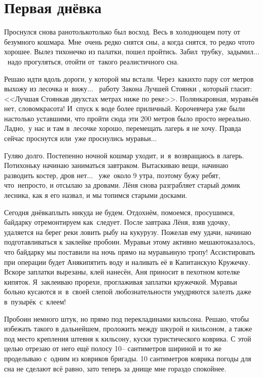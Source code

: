 \chapter{Первая днёвка}
\vepsianrose

Проснулся снова рано\mdash только\sdash только был восход. Весь в холоднющем поту от безумного кошмара. Мне~очень редко снятся сны, а когда снятся, то редко что\sdash то хорошее. Вылез тихонечко из палатки, пошел пройтись. Забил~трубку,~задымил$\ldots$ ~надо прогуляться, отойти от~такого реалистичного сна.

Решаю идти вдоль дороги, у которой мы встали. Через~каких\sdash то пару сот метров выхожу из лесочка и~вижу$\ldots$~ работу Закона Лучшей Стоянки \cite{Квадригин}, который гласит: <<Лучшая Стоянка\mdash в двухстах метрах ниже по реке>>. Полянка\mdash ровная, муравьёв нет, словом\mdash красота! И~спуск к воде более приличный. Короче\mdash вчера уже были настолько уставшими, что пройти сюда эти 200 метров было просто нереально. Ладно,~у нас и там в~лесочке хорошо, перемещать лагерь я не хочу. Правда сейчас проснутся или~уже проснулись муравьи$\ldots$

Гуляю долго. Постепенно ночной кошмар уходит, и~я~возвращаюсь в лагерь. Потихоньку начинаю заниматься завтраком. Вытаскиваю вещи, начинаю разводить костер, дров нет$\ldots$~ уже~около 9 утра, поэтому бужу ребят, что~непросто, и отсылаю за дровами. Лёня снова разграбляет старый домик лесника, как я его назвал, и мы топимся старыми досками. 

Сегодня днёвка\mdash плыть никуда не будем. Отдохнём, помоемся, просушимся, байдарку отремонтируем как~следует. После завтрака Лёня, взяв удочку, удаляется на берег реки ловить рыбу на кукурузу. Пожелав ему удачи, начинаю подготавливаться к заклейке пробоин. Муравьи этому активно мешают\mdash оказалось, что байдарку мы поставили на ночь прямо на муравьиную тропу! Ассистировать при операции будет Аня\mdash кипятить воду и наливать её в Капитанскую Кружечку. Вскоре заплатки вырезаны, клей нанесён, Аня приносит в пехотном котелке кипяток. Я~заклеиваю прорехи, проглаживая заплатки кружечкой. Муравьи больно кусаются и~в~своей слепой любознательности умудряются залезть даже в~пузырёк~с~клеем! 

Пробоин немного штук, но прямо под перекладинами кильсона. Решаю, чтобы избежать такого в дальнейшем, проложить между шкурой и кильсоном, а также под место крепления штевня к кильсону, куски туристического коврика. С этой целью отрезаю от него ещё полосу 10\thinspace-- сантиметров шириной и то же проделываю с~одним из ковриков бригады. 10 сантиметров коврика погоды для сна не сделают всё равно, зато теперь за днище мне гораздо спокойнее. 

